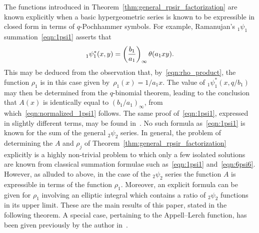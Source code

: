 \documentclass[pdftex]{sigma}
\numberwithin{equation}{section}
\begin{document}
The functions introduced in Theorem~\ref{thm:general_rpsir_factorization} are known explicitly when a basic hypergeometric series is known to be expressible in closed form in terms of $q$-Pochhammer symbols. For example, Ramanujan's $_1\psi_1$ summation~\eqref{eqn:1psi1} asserts that
\begin{equation} \label{eqn:normalized_1psi1}
_1^{}\psi_1^\ast(x,y) = \left({b_1 \over a_1}\right)_{ \infty} \theta(a_1xy).
\end{equation}
This may be deduced from the observation that, by~\eqref{eqn:rho_product}, the function $\rho_1$ is in this case given by~${\rho_1(x)=1/a_1x}$. The value of $_1\psi_1^\ast(x,q/b_1)$ may then be determined from the $q$-binomial theorem, leading to the conclusion that $A(x)$ is identically equal to $(b_1/a_1)_\infty$, from which~\eqref{eqn:normalized_1psi1} follows. The same proof of~\eqref{eqn:1psi1}, expressed in slightly different terms, may be found in~\cite[Section~1.1]{Ito2014}. No such formula as~\eqref{eqn:1psi1} is known for the sum of the general $_2\psi_2$ series. In general, the problem of determining the $A$ and $\rho_j$ of Theorem~\ref{thm:general_rpsir_factorization} explicitly is a highly non-trivial problem to which only a few isolated solutions are known from classical summation formulae such as~\eqref{eqn:1psi1} and~\eqref{eqn:6psi6}. However, as alluded to above, in the case of the $_2\psi_2$ series the function $A$ is expressible in terms of the function $\rho_1$. Moreover, an explicit formula can be given for $\rho_1$ involving an elliptic integral which contains a ratio of $_2\psi_2$ functions in its upper limit. These are the main results of this paper, stated in the following theorem. A special case, pertaining to the Appell--Lerch function, has been given previously by the author in~\cite[Section~3.8]{Bradley-Thrush2023}.
\end{document}
